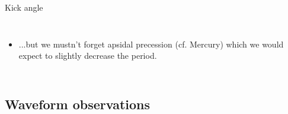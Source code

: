 \documentclass[smaller,aspectratio=169]{beamer}
\begin{document}
\begin{frame}{Kick angle}
\begin{columns}
\begin{itemize}
{                    which is not really dependent on the mass ratio.}
				\item<5->
					...but we mustn't forget \alert{apsidal precession} 
					(cf. Mercury) which we would expect to 
					slightly decrease the period.
			\end{itemize}
	\end{columns}
\end{frame}

\subsection{Waveform observations}
\end{document}
